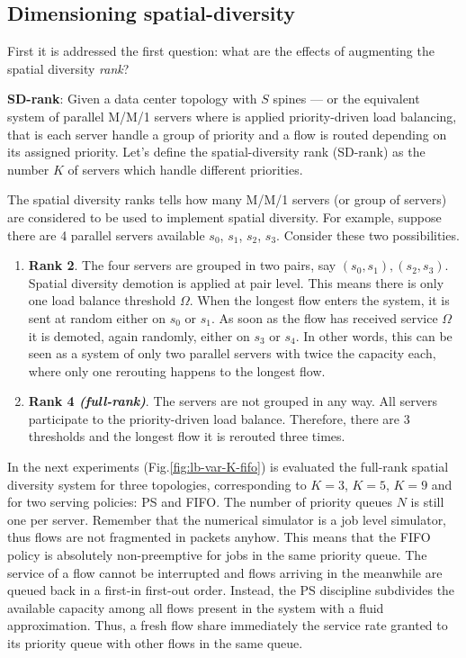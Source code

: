 \subsection{Dimensioning spatial-diversity}
\label{sec:dimensioning-spatial}
First it is addressed the first question: what are the effects of augmenting the spatial diversity \emph{rank}? 
\begin{tcolorbox}[title=Terminology]
	\textbf{SD-rank}: Given a data center topology with $S$ spines --- or the equivalent system of parallel M/M/1 servers where is applied priority-driven load balancing, that is each server handle a group of priority and a flow is routed depending on its assigned priority. Let's define the spatial-diversity rank (SD-rank) as the number $K$ of servers which handle different priorities. 
\end{tcolorbox}
The spatial diversity ranks tells how many M/M/1 servers (or group of servers) are considered to be used to implement spatial diversity. For example, suppose there are 4 parallel servers available $s_0$, $s_1$, $s_2$, $s_3$. Consider these two possibilities. 
\begin{enumerate}
	\item \textbf{Rank 2}. The four servers are grouped in two pairs, say $(s_0, s_1), (s_2,s_3)$. Spatial diversity demotion is applied at pair level. This means there is only one load balance threshold $\Omega$. When the longest flow enters the system, it is sent at random either on $s_0$ or $s_1$. As soon as the flow has received service $\Omega$ it is demoted, again randomly, either on $s_3$ or $s_4$. In other words, this can be seen as a system of only two parallel servers with twice the capacity each, where only one rerouting happens to the longest flow. 
	\item \textbf{Rank 4 \textit{(full-rank)}}. The servers are not grouped in any way. All servers participate to the priority-driven load balance. Therefore, there are 3 thresholds and the longest flow it is rerouted three times.
\end{enumerate}
In the next experiments (Fig.\ref{fig:lb-var-K-fifo}) is evaluated the full-rank spatial diversity system for three topologies, corresponding to $K=3$, $K=5$, $K=9$ and for two serving policies: PS and FIFO. The number of priority queues $N$ is still one per server. Remember that the numerical simulator is a job level simulator, thus flows are not fragmented in packets anyhow. This means that the FIFO policy is absolutely non-preemptive for jobs in the same priority queue. The service of a flow cannot be interrupted and flows arriving in the meanwhile are queued back in a first-in first-out order. Instead, the PS discipline subdivides the available capacity among all flows present in the system with a fluid approximation. Thus, a fresh flow share immediately the service rate granted to its priority queue with other flows in the same queue. 
